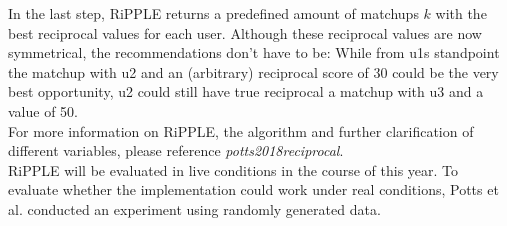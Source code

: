 \documentclass[nochapterpage,bigchapter,linedtoc,longdoc,colorback,accentcolor=tud3b,oneside]{tudreport}
\begin{document}
In the last step, RiPPLE returns a predefined amount of matchups \(k\) with the best reciprocal values for each user. Although these reciprocal values are now symmetrical, the recommendations don't have to be: While from u1s standpoint the matchup with u2 and an (arbitrary) reciprocal score of 30 could be the very best opportunity, u2 could still have true reciprocal a matchup with u3 and a value of 50.\\
For more information on RiPPLE, the algorithm and further clarification of different variables, please reference \textit{potts2018reciprocal}.\\	
RiPPLE will be evaluated in live conditions in the course of this year. To evaluate whether the implementation could work under real conditions, Potts et al. conducted an experiment using randomly generated data.\\
\end{document}
